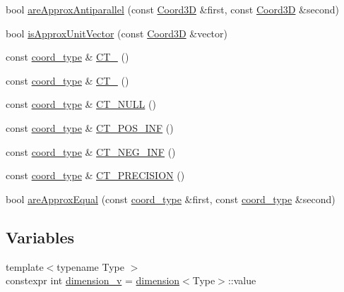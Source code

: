 \begin{DoxyCompactItemize}
\item 
bool \hyperlink{namespaceMcCAD_1_1Geometry_a217e83a743aba0da9831e8f6fca5b44b}{are\+Approx\+Antiparallel} (const \hyperlink{classMcCAD_1_1Geometry_1_1Coord3D}{Coord3D} \&first, const \hyperlink{classMcCAD_1_1Geometry_1_1Coord3D}{Coord3D} \&second)
\item 
bool \hyperlink{namespaceMcCAD_1_1Geometry_a645532f9f054fcbae341c5a3e6ca2fd2}{is\+Approx\+Unit\+Vector} (const \hyperlink{classMcCAD_1_1Geometry_1_1Coord3D}{Coord3D} \&vector)
\item 
const \hyperlink{namespaceMcCAD_1_1Geometry_ac043b37a4a7e849fca22869e1982d2f8}{coord\+\_\+type} \& \hyperlink{namespaceMcCAD_1_1Geometry_ac29462a1071e96a3eb0bce1b4097af64}{C\+T\+\_} ()
\item 
const \hyperlink{namespaceMcCAD_1_1Geometry_ac043b37a4a7e849fca22869e1982d2f8}{coord\+\_\+type} \& \hyperlink{namespaceMcCAD_1_1Geometry_ad34c7456a52e2372fad7d4824eaa9e23}{C\+T\+\_} ()
\item 
const \hyperlink{namespaceMcCAD_1_1Geometry_ac043b37a4a7e849fca22869e1982d2f8}{coord\+\_\+type} \& \hyperlink{namespaceMcCAD_1_1Geometry_a7a1a1f1e3e0547cde4d81dec1a126c28}{C\+T\+\_\+\+N\+U\+LL} ()
\item 
const \hyperlink{namespaceMcCAD_1_1Geometry_ac043b37a4a7e849fca22869e1982d2f8}{coord\+\_\+type} \& \hyperlink{namespaceMcCAD_1_1Geometry_a945de946c04dd593309595bc369b5163}{C\+T\+\_\+\+P\+O\+S\+\_\+\+I\+NF} ()
\item 
const \hyperlink{namespaceMcCAD_1_1Geometry_ac043b37a4a7e849fca22869e1982d2f8}{coord\+\_\+type} \& \hyperlink{namespaceMcCAD_1_1Geometry_a3d66ef52d0555244290d60a8bfa6d781}{C\+T\+\_\+\+N\+E\+G\+\_\+\+I\+NF} ()
\item 
const \hyperlink{namespaceMcCAD_1_1Geometry_ac043b37a4a7e849fca22869e1982d2f8}{coord\+\_\+type} \& \hyperlink{namespaceMcCAD_1_1Geometry_a492f5d9026e8ba8e85f0c81dfb0694ea}{C\+T\+\_\+\+P\+R\+E\+C\+I\+S\+I\+ON} ()
\item 
bool \hyperlink{namespaceMcCAD_1_1Geometry_a41fdb0f8b08a3b0dfc6547d0e0c6841d}{are\+Approx\+Equal} (const \hyperlink{namespaceMcCAD_1_1Geometry_ac043b37a4a7e849fca22869e1982d2f8}{coord\+\_\+type} \&first, const \hyperlink{namespaceMcCAD_1_1Geometry_ac043b37a4a7e849fca22869e1982d2f8}{coord\+\_\+type} \&second)
\end{DoxyCompactItemize}
\subsection*{Variables}
\begin{DoxyCompactItemize}
\item 
{\footnotesize template$<$typename Type $>$ }\\constexpr int \hyperlink{namespaceMcCAD_1_1Geometry_a609ecc8fedf120159984a785d234a14e}{dimension\+\_\+v} = \hyperlink{structMcCAD_1_1Geometry_1_1dimension}{dimension}$<$Type$>$\+::value
\end{DoxyCompactItemize}


